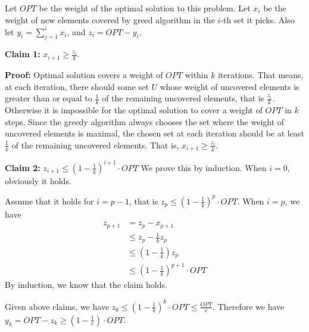 \documentclass{article}
\begin{document}
Let $OPT$ be the weight of the optimal solution to this problem.
Let $x_i$ be the weight of new elements covered by greed algorithm in the $i$-th set it picks. Also
let $y_i = \sum_{j=1}^{i}x_i$, and $z_i = OPT - y_i$.  

\textbf{Claim 1:} $x_{i+1} \geq \frac{z_i}{k}$.

\textbf{Proof:}
Optimal solution covers a weight of $OPT$ within $k$ iterations. That means, at each iteration,
there should some set $U$ whose weight of uncovered elements is greater than or equal to
$\frac{1}{k}$
of the remaining uncovered elements, that is $\frac{z_i}{k}$. Otherwise it is impossible for the
optimal solution to cover a weight of $OPT$ in $k$ steps. Since the greedy algorithm always chooses
the set where the weight of uncovered elements is maximal, the chosen set at each iteration should
be at least $\frac{1}{k}$ of the remaining uncovered elements. That is, $x_{i+1} \geq \frac{z_i}{k}$.

\textbf{Claim 2:} $z_{i+1} \leq (1 - \frac{1}{k})^{i+1} \cdot OPT$
We prove this by induction. When $i = 0$, obviously it holds.

Assume that it holds for $i = p - 1$, that is $z_{p} \leq (1 - \frac{1}{k})^{p} \cdot OPT$. When $i
= p$, we have
\begin{align}
  z_{p+1} & = z_{p} - x_{p+1} \\
  &\leq z_{p} - \frac{1}{k} z_{p} \\
  &\leq (1 - \frac{1}{k})z_p \\
  & \leq (1 - \frac{1}{k})^{p+1} \cdot OPT
\end{align}
By induction, we know that the claim holds.

Given above claims, we have $z_k \leq (1 - \frac{1}{k}) ^k \cdot OPT \leq \frac{OPT}{e}$. Therefore
we have $y_k = OPT - z_k \geq (1 -  \frac{1}{e}) \cdot OPT$.




\end{document}

